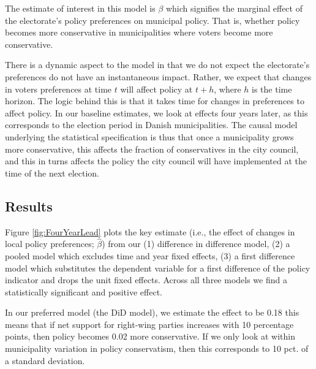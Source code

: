 \documentclass[a4paper,12pt]{article}
\begin{document}
The estimate of interest in this model is $\beta$ which signifies the marginal effect of the electorate's policy preferences on municipal policy. That is, whether policy becomes more conservative in municipalities where voters become more conservative. 

There is a dynamic aspect to the model in that we do not expect the electorate's preferences do not have an instantaneous impact. Rather, we expect that changes in voters preferences at time $t$ will affect policy at $t+h$, where $h$ is the time horizon. The logic behind this is that it takes time for changes in preferences to affect policy. In our baseline estimates, we look at effects four years later, as this corresponds to the election period in Danish municipalities. The causal model underlying the statistical specification is thus that once a municipality grows more conservative, this affects the fraction of conservatives in the city council, and this in turns affects the policy the city council will have implemented at the time of the next election.

\subsection{Results}
Figure \ref{fig:FourYearLead} plots the key estimate (i.e., the effect of changes in local policy preferences; $\hat{\beta}$) from our (1) difference in difference model, (2) a pooled model which excludes time and year fixed effects, (3) a first difference model which substitutes the dependent variable for a first difference of the policy indicator and drops the unit fixed effects.  Across all three models we find a statistically significant and positive effect.

In our preferred model (the DiD model), we estimate the effect to be 0.18 this means that if net support for right-wing parties increases with 10 percentage points, then policy becomes 0.02 more conservative. If we only look at within municipality variation in policy conservatism, then this corresponds to 10 pct. of a standard deviation. 
\end{document}

